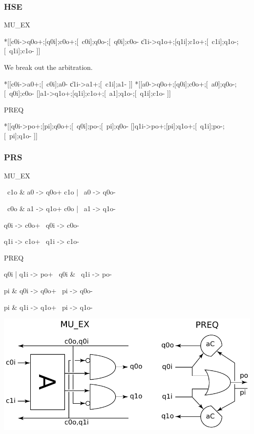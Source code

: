 \documentclass{article}
\begin{document}
\subsubsection*{HSE}

MU\_EX
\begin{hse}
*[[c0i->q0o+;[q0i];c0o+;[~c0i];q0o-;[~q0i];c0o-
  \|c1i->q1o+;[q1i];c1o+;[~c1i];q1o-;[~q1i];c1o-
 ]]
\end{hse}

We break out the arbitration.

\begin{hse}
*[[c0i->a0+;[~c0i];a0-
  \|c1i->a1+;[~c1i];a1-
 ]]
*[[a0->q0o+;[q0i];c0o+;[~a0];q0o-;[~q0i];c0o-
  []a1->q1o+;[q1i];c1o+;[~a1];q1o-;[~q1i];c1o-
 ]]
\end{hse}

\noindent PREQ

\begin{hse}
*[[q0i->po+;[pi];q0o+;[~q0i];po-;[~pi];q0o-
  []q1i->po+;[pi];q1o+;[~q1i];po-;[~pi];q1o-
 ]]
\end{hse}

\subsubsection*{PRS}

MU\_EX

\begin{prs2}
~c1o & a0 -> q0o+
c1o | ~a0 -> q0o-

~c0o & a1 -> q1o+
c0o | ~a1 -> q1o-
\end{prs2}

\begin{prs2}
q0i -> c0o+
~q0i -> c0o-

q1i -> c1o+
~q1i -> c1o-
\end{prs2}

\noindent PREQ

\begin{prs2}
q0i | q1i -> po+
~q0i & ~q1i -> po-
\end{prs2}

\begin{prs2}
pi & q0i -> q0o+
~pi -> q0o-

pi & q1i -> q1o+
~pi -> q1o-
\end{prs2}

\begin{center}
  \includegraphics[width=.7\textwidth]{img/standardnwayarbiter.pdf}
\end{center}
\end{document}
